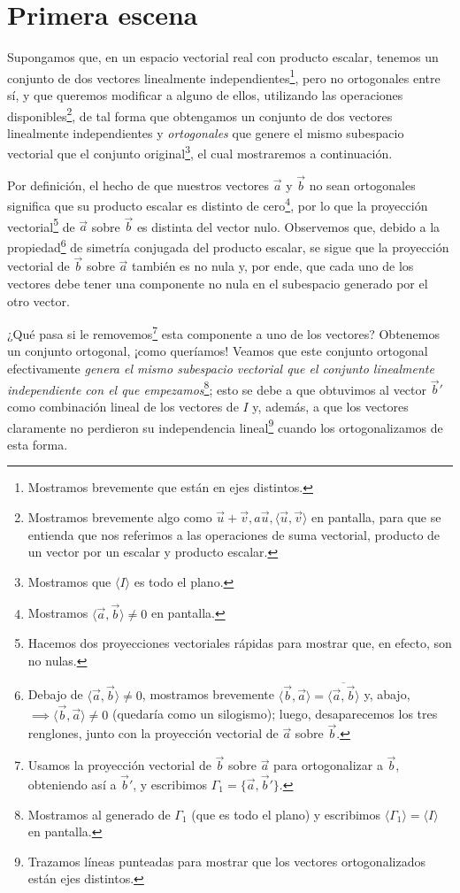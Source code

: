 \documentclass[12pt,dvipsnames]{article}
\numberwithin{equation}{section}
\begin{document}

\newpage
\section{Primera escena}

Supongamos que, en un espacio vectorial real con producto escalar, tenemos un conjunto de dos vectores linealmente independientes\footnote{Mostramos brevemente que están en ejes distintos.}, pero no ortogonales entre sí, y que queremos modificar a alguno de ellos, utilizando las operaciones disponibles\footnote{Mostramos brevemente algo como $\vec{u}+\vec{v}, a\vec{u}, \langle\vec{u},\vec{v}\rangle$ en pantalla, para que se entienda que nos referimos a las operaciones de suma vectorial, producto de un vector por un escalar y producto escalar.}, de tal forma que obtengamos un conjunto de dos vectores linealmente independientes y \emph{ortogonales} que genere el mismo subespacio vectorial que el conjunto original\footnote{Mostramos que $\langle I\rangle$ es todo el plano.}, el cual mostraremos a continuación.

Por definición, el hecho de que nuestros vectores $\vec{a}$ y $\vec{b}$ no sean ortogonales significa que su producto escalar es distinto de cero\footnote{Mostramos $\langle \vec{a},\vec{b}\rangle\neq0$ en pantalla.}, por lo que la proyección vectorial\footnote{Hacemos dos proyecciones vectoriales rápidas para mostrar que, en efecto, son no nulas.} de $\vec{a}$ sobre $\vec{b}$ es distinta del vector nulo. Observemos que, debido a la propiedad\footnote{Debajo de $\langle\vec{a},\vec{b}\rangle\neq0$, mostramos brevemente $\langle \vec{b},\vec{a}\rangle = \overline{\langle \vec{a},\vec{b}\rangle}$ y, abajo, $\implies \langle\vec{b},\vec{a}\rangle\neq0$ (quedaría como un silogismo); luego, desaparecemos los tres renglones, junto con la proyección vectorial de $\vec{a}$ sobre $\vec{b}$.} de simetría conjugada del producto escalar, se sigue que la proyección vectorial de $\vec{b}$ sobre $\vec{a}$ también es no nula y, por ende, que cada uno de los vectores debe tener una componente no nula en el subespacio generado por el otro vector.

¿Qué pasa si le removemos\footnote{Usamos la proyección vectorial de $\vec{b}$ sobre $\vec{a}$ para ortogonalizar a $\vec{b}$, obteniendo así a $\vec{b}'$, y escribimos $\Gamma_1=\{\vec{a},\vec{b}'\}$.} esta componente a uno de los vectores? Obtenemos un conjunto ortogonal, ¡como queríamos! Veamos que este conjunto ortogonal efectivamente \emph{genera el mismo subespacio vectorial que el conjunto linealmente independiente con el que empezamos}\footnote{Mostramos al generado de $\Gamma_1$ (que es todo el plano) y escribimos $\langle \Gamma_1 \rangle = \langle I \rangle$ en pantalla.}; esto se debe a que obtuvimos al vector $\vec{b}'$ como combinación lineal de los vectores de $I$ y, además, a que los vectores claramente no perdieron su independencia lineal\footnote{Trazamos líneas punteadas para mostrar que los vectores ortogonalizados están ejes distintos.} cuando los ortogonalizamos de esta forma.
\end{document}

